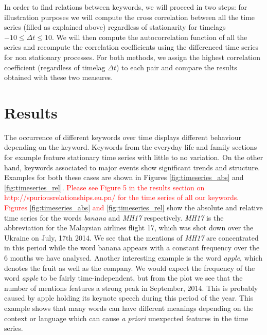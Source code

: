 \documentclass[12pt, a4paper]{article}
\begin{document}
In order to find relations between keywords, we will proceed in two steps: for illustration purposes we will compute the cross correlation between all the time series (filled as explained above) regardless of stationarity for timelags $-10 \leq \Delta t \leq 10$. We will then compute the autocorrelation function of all the series and recompute the correlation coefficients using the differenced time series for non stationary processes. For both methods, we assign the highest correlation coefficient (regardless of timelag $\Delta t$) to each pair and compare the results obtained with these two measures. 

\section{Results}
The occurrence of different keywords over time displays different behaviour depending on the keyword. Keywords from the everyday life and family sections for example feature stationary time series with little to no variation. On the other hand, keywords associated to major events show significant trends and structure. Examples for both these cases are shown in Figures \ref{fig:timeseries_abs} and \ref{fig:timeseries_rel}.  \textcolor{red}{Please see Figure 5 in the results section on http://spuriousrelationships.eu.pn/ for the time series of all our keywords. Figures \ref{fig:timeseries_abs} and \ref{fig:timeseries_rel}} show the absolute and relative time series for the words \textit{banana} and \textit{MH17} respectively. \textit{MH17} is the abbreviation for the Malaysian airlines flight 17, which was shot down over the Ukraine on July, 17th 2014. We see that the mentions of \textit{MH17} are concentrated in this period while the word banana appears with a constant frequency over the 6 months we have analysed. Another interesting example is the word \textit{apple}, which denotes the fruit as well as the company. We would expect the frequency of the word \textit{apple} to be fairly time-independent, but from the plot we see that the number of mentions features a strong peak in September, 2014. This is probably caused by apple holding its keynote speech during this period of the year. This example shows that many words can have different meanings depending on the context or language which can cause \textit{a priori} unexpected features in the time series. 
\end{document}
